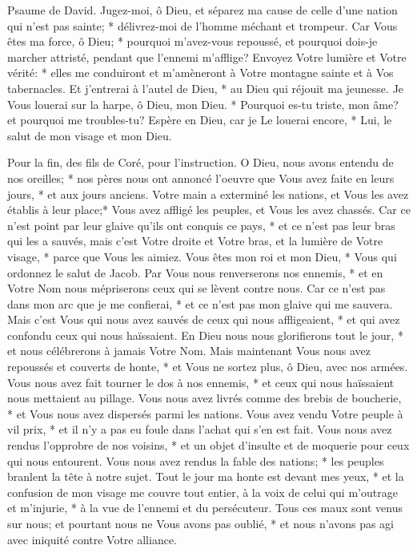 Psaume de David. Jugez-moi, ô Dieu, et séparez ma cause de celle d'une nation qui n'est pas sainte; * délivrez-moi de l'homme méchant et trompeur.
Car Vous êtes ma force, ô Dieu; * pourquoi m'avez-vous repoussé, et pourquoi dois-je marcher attristé, pendant que l'ennemi m'afflige?
Envoyez Votre lumière et Votre vérité: * elles me conduiront et m'amèneront à Votre montagne sainte et à Vos tabernacles.
Et j'entrerai à l'autel de Dieu, * au Dieu qui réjouit ma jeunesse. Je Vous louerai sur la harpe, ô Dieu, mon Dieu. *
Pourquoi es-tu triste, mon âme? et pourquoi me troubles-tu? Espère en Dieu, car je Le louerai encore, * Lui, le salut de mon visage et mon Dieu.

Pour la fin, des fils de Coré, pour l'instruction.
O Dieu, nous avons entendu de nos oreilles; * nos pères nous ont annoncé l'oeuvre que Vous avez faite en leurs jours, * et aux jours anciens.
Votre main a exterminé les nations, et Vous les avez établis à leur place;* Vous avez affligé les peuples, et Vous les avez chassés.
Car ce n'est point par leur glaive qu'ils ont conquis ce pays, * et ce n'est pas leur bras qui les a sauvés, mais c'est Votre droite et Votre bras, et la lumière de Votre visage, * parce que Vous les aimiez.
Vous êtes mon roi et mon Dieu, * Vous qui ordonnez le salut de Jacob.
Par Vous nous renverserons nos ennemis, * et en Votre Nom nous mépriserons ceux qui se lèvent contre nous.
Car ce n'est pas dans mon arc que je me confierai, * et ce n'est pas mon glaive qui me sauvera.
Mais c'est Vous qui nous avez sauvés de ceux qui nous affligeaient, * et qui avez confondu ceux qui nous haïssaient.
En Dieu nous nous glorifierons tout le jour, * et nous célébrerons à jamais Votre Nom.
Mais maintenant Vous nous avez repoussés et couverts de honte, * et Vous ne sortez plus, ô Dieu, avec nos armées.
Vous nous avez fait tourner le dos à nos ennemis, * et ceux qui nous haïssaient nous mettaient au pillage.
Vous nous avez livrés comme des brebis de boucherie, * et Vous nous avez dispersés parmi les nations.
Vous avez vendu Votre peuple à vil prix, * et il n'y a pas eu foule dans l'achat qui s'en est fait.
Vous nous avez rendus l'opprobre de nos voisins, * et un objet d'insulte et de moquerie pour ceux qui nous entourent.
Vous nous avez rendus la fable des nations; * les peuples branlent la tête à notre sujet.
Tout le jour ma honte est devant mes yeux, * et la confusion de mon visage me couvre tout entier,
à la voix de celui qui m'outrage et m'injurie, * à la vue de l'ennemi et du persécuteur.
Tous ces maux sont venus sur nous; et pourtant nous ne Vous avons pas oublié, * et nous n'avons pas agi avec iniquité contre Votre alliance.
